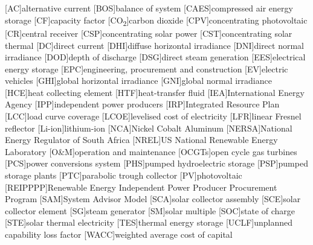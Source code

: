 {}
\chapter*{\listacroname}
\begin{acronym}[XXXXX]
  	[AC]{alternative current}
  	[BOS]{balance of system}
  	[CAES]{compressed air energy storage}
  	[CF]{capacity factor}
  	[CO\textsubscript{2}]{carbon dioxide}
    [CPV]{concentrating photovoltaic}
    [CR]{central receiver}
    [CSP]{concentrating solar power}
    [CST]{concentrating solar thermal} 
    [DC]{direct current}
    [DHI]{diffuse horizontal irradiance}
    [DNI]{direct normal irradiance}
	[DOD]{depth of discharge}
    [DSG]{direct steam generation}
    [EES]{electrical energy storage}
    [EPC]{engineering, procurement and construction}
    [EV]{electric vehicles}
    [GHI]{global horizontal irradiance}
    [GNI]{global normal irradiance}
    [HCE]{heat collecting element}
    [HTF]{heat-transfer fluid} 
    [IEA]{International Energy Agency}
    [IPP]{independent power producers}
    [IRP]{Integrated Resource Plan}
    [LCC]{load curve coverage}
    [LCOE]{levelised cost of electricity}
    [LFR]{linear Fresnel reflector}
    [Li-ion]{lithium-ion}  
    [NCA]{Nickel Cobalt Aluminum}
    [NERSA]{National Energy Regulator of South Africa}
    [NREL]{US National Renewable Energy Laboratory}
    [O\&M]{operation and maintenance}
    [OCGTs]{open cycle gas turbines}
    [PCS]{power conversions system}
    [PHS]{pumped hydroelectric storage}
    [PSP]{pumped storage plants}
    [PTC]{parabolic trough collector}
    [PV]{photovoltaic}
    [REIPPPP]{Renewable Energy Independent Power Producer Procurement Program}
    [SAM]{System Advisor Model}
    [SCA]{solar collector assembly}
    [SCE]{solar collector element}
    [SG]{steam generator}
    [SM]{solar multiple}
    [SOC]{state of charge}
    [STE]{solar thermal electricity}
    [TES]{thermal energy storage}
    [UCLF]{unplanned capability loss factor}
    [WACC]{weighted average cost of capital}
\end{acronym}
